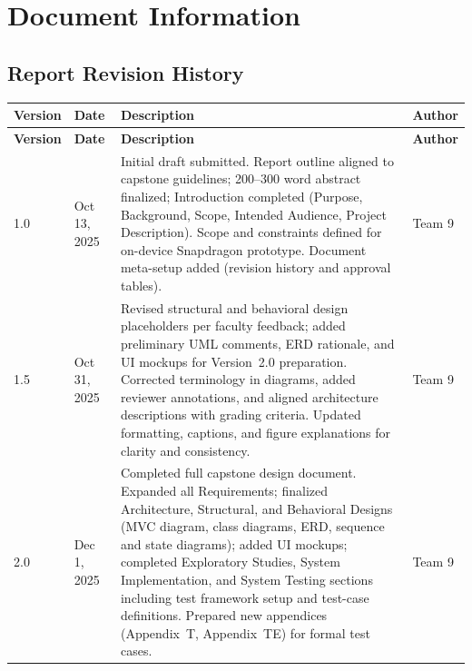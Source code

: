 \documentclass[11pt]{report}
\begin{document}
\chapter{Document Information}

\section{Report Revision History}

\renewcommand{\arraystretch}{1.15}
\setlength{\tabcolsep}{6pt}

\begin{longtable}{|p{2cm}|p{3cm}|p{7.8cm}|p{3cm}|}
    \hline
    \textbf{Version} & \textbf{Date} & \textbf{Description} & \textbf{Author} \\
    \hline
    \endfirsthead

    \hline
    \textbf{Version} & \textbf{Date} & \textbf{Description} & \textbf{Author} \\
    \hline
    \endhead

    \hline
    \endfoot

    \hline
    \endlastfoot

    1.0 & Oct 13, 2025 &
    Initial draft submitted. Report outline aligned to capstone guidelines; 200--300 word abstract finalized; Introduction completed (Purpose, Background, Scope, Intended Audience, Project Description). Scope and constraints defined for on-device Snapdragon prototype. Document meta-setup added (revision history and approval tables). &
    Team 9 \\
    \hline

    1.5 & Oct 31, 2025 &
    Revised structural and behavioral design placeholders per faculty feedback; added preliminary UML comments, ERD rationale, and UI mockups for Version~2.0 preparation. Corrected terminology in diagrams, added reviewer annotations, and aligned architecture descriptions with grading criteria. Updated formatting, captions, and figure explanations for clarity and consistency. &
    Team 9 \\
    \hline

    2.0 & Dec 1, 2025 &
    Completed full capstone design document. Expanded all Requirements; finalized Architecture, Structural, and Behavioral Designs (MVC diagram, class diagrams, ERD, sequence and state diagrams); added UI mockups; completed Exploratory Studies, System Implementation, and System Testing sections including test framework setup and test-case definitions. Prepared new appendices (Appendix~T, Appendix~TE) for formal test cases. &
    Team 9 \\
    \hline


\end{longtable}
\end{document}
